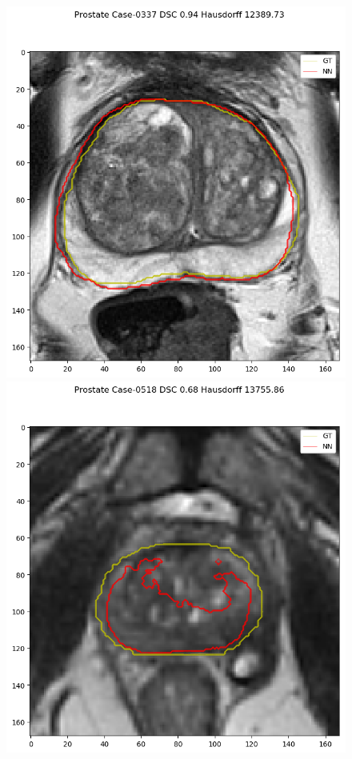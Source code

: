 \begin{figure}[h]
    \includegraphics[totalheight=.2\textheight]{imgs/results/Prostate_Px_Challenge__P_yes_ROI_MAX_Case-0337.png}
    \vspace{10mm}
    \includegraphics[totalheight=.2\textheight]{imgs/results/Prostate_GE__GE_yes_ROI_MIN_Case-0518.png}

\end{figure}
